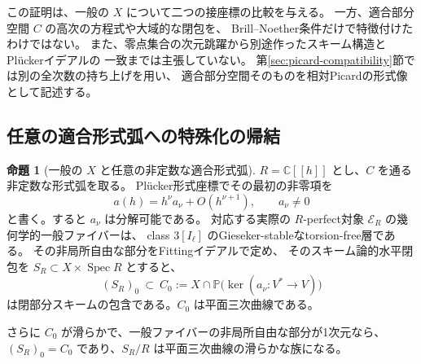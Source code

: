 \documentclass[a4paper,11pt]{ltjsarticle}
\theoremstyle{definition}
\newtheorem{theorem}{命題}[section]
\newcommand{\CC}{\mathbb C}
\newcommand{\PP}{\mathbb P}
\begin{document}
この証明は、一般の $X$ について二つの接座標の比較を与える。
一方、適合部分空間 $C$ の高次の方程式や大域的な閉包を、
Brill--Noether条件だけで特徴付けたわけではない。
また、零点集合の次元跳躍から別途作ったスキーム構造とPl\"uckerイデアルの
一致までは主張していない。
第\ref{sec:picard-compatibility}節では別の全次数の持ち上げを用い、
適合部分空間そのものを相対Picardの形式像として記述する。

\subsection{任意の適合形式弧への特殊化の帰結}

\begin{theorem}[一般の $X$ と任意の非定数な適合形式弧]
\label{thm:general-compatible-arc-bn}
$R=\CC[[h]]$ とし、$C$ を通る非定数な形式弧を取る。
Pl\"ucker形式座標でその最初の非零項を
\[
 a(h)=h^\nu a_\nu+O(h^{\nu+1}),\qquad a_\nu\ne0
\]
と書く。すると $a_\nu$ は分解可能である。
対応する実際の $R$-perfect対象 $\mathcal E_R$ の幾何学的一般ファイバーは、
class $3[I_\ell]$ のGieseker-stableなtorsion-free層である。
その非局所自由な部分をFittingイデアルで定め、
そのスキーム論的水平閉包を $S_R\subset X\times\operatorname{Spec}R$ とすると、
\[
 (S_R)_0\ \subset\
 C_0:=X\cap\PP\bigl(\ker(a_\nu:V^*\to V)\bigr)
\]
は閉部分スキームの包含である。$C_0$ は平面三次曲線である。

さらに $C_0$ が滑らかで、一般ファイバーの非局所自由な部分が1次元なら、
$(S_R)_0=C_0$ であり、$S_R/R$ は平面三次曲線の滑らかな族になる。
\end{theorem}
\end{document}
